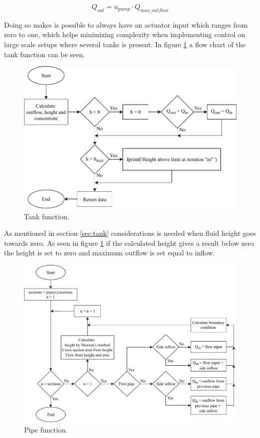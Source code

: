\begin{equation}\label{eq:imp_tank_outflow}
	Q_{out} = u_{pump} \cdot Q_{max\_outflow}
\end{equation} 

Doing so makes is possible to always have an actuator input which ranges from zero to one, which helps minimizing complexity when implementing control on large scale setups where several tanks is present. In figure \ref{fig:tank_function} a flow chart of the tank function can be seen.

\begin{figure}[H]
\centering
\includegraphics[width=0.9 \textwidth]{report/simulation/pictures/tank_function.pdf}
\caption{Tank function.}
\label{fig:tank_function}
\end{figure}

As mentioned in section \ref{sec:tank} considerations is needed when fluid height goes towards zero. As seen in figure \ref{fig:tank_function} if the calculated height gives a result below zero the height is set to zero and maximum outflow is set equal to inflow.  






\begin{figure}[H]
\centering
\includegraphics[width=0.9 \textwidth]{report/simulation/pictures/pipe_function.pdf}
\caption{Pipe function.}
\label{fig:pipe_function}
\end{figure}
